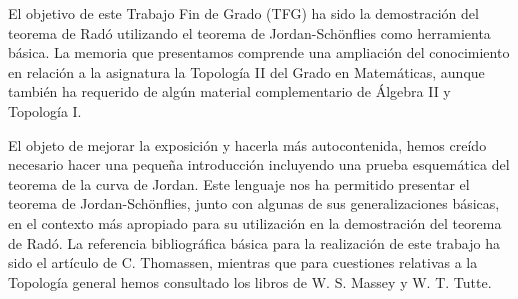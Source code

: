 El objetivo  de este Trabajo Fin de Grado (TFG) ha sido la demostración del teorema de Radó   utilizando el teorema de Jordan-Schönflies como herramienta básica. La memoria que presentamos comprende una ampliación del conocimiento en relación a la asignatura la Topología II del Grado en Matemáticas,   aunque también ha requerido  de algún material complementario de  Álgebra II y Topología I.  

El objeto de mejorar la exposición y hacerla más autocontenida, hemos creído necesario hacer una pequeña introducción incluyendo  una prueba esquemática   del teorema de la curva de Jordan. Este lenguaje nos ha permitido  presentar el teorema de Jordan-Schönflies, junto con algunas de sus generalizaciones básicas, en el contexto más apropiado para su utilización   en la demostración del teorema de Radó. La referencia bibliográfica básica para la realización de este trabajo ha sido el artículo de C. Thomassen, \cite{Thomassen}  mientras que para cuestiones relativas a la Topología general hemos consultado los libros de W. S. Massey \cite{Massey} y W. T. Tutte. \cite{Tutte}
